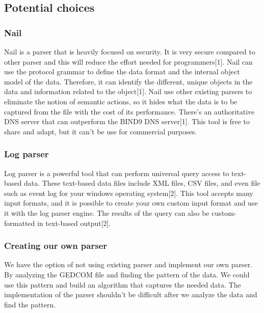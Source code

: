 \documentclass[onecolumn, draftclsnofoot,10pt, compsoc]{IEEEtran}
\begin{document}
\subsection{Potential choices}

\subsubsection{Nail}
\begin{singlespace}
Nail is a parser that is heavily focused on security. It is very secure compared to other parser and this will reduce the effort needed for programmers[1]. Nail can use the protocol grammar to define the data format and the internal object model of the data. Therefore, it can identify the different, unique objects in the data and information related to the object[1]. Nail use other existing parsers to eliminate the notion of semantic actions, so it hides what the data is to be captured from the file with the cost of its performance. There's an authoritative DNS server that can outperform the BIND9 DNS server[1]. This tool is free to share and adapt, but it can't be use for commercial purposes. 
\end{singlespace}

\subsubsection{Log parser}
\begin{singlespace}
Log parser is a powerful tool that can perform universal query access to text-based data. These text-based data files include XML files, CSV files, and even file such as event log for your windows operating system[2]. This tool accepts many input formats, and it is possible to create your own custom input format and use it with the log parser engine. The results of the query can also be custom-formatted in text-based output[2].
\end{singlespace}
 

\subsubsection{Creating our own parser}
\begin{singlespace}
We have the option of not using existing parser and implement our own parser. By analyzing the GEDCOM file and finding the pattern of the data. We could use this pattern and build an algorithm that captures the needed data. The implementation of the parser shouldn't be difficult after we analyze the data and find the pattern.
\end{singlespace}
\end{document}
